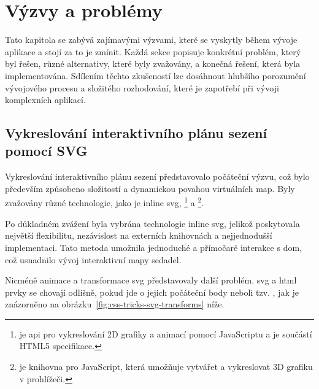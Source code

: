 \chapter{Výzvy a problémy}
\label{ch:vyzvy-a-problemy}
Tato kapitola se zabývá zajímavými výzvami, které se vyskytly během vývoje aplikace a stojí za to je zmínit.
Každá sekce popisuje konkrétní problém, který byl řešen, různé alternativy, které byly zvažovány, a konečná řešení, která byla implementována.
Sdílením těchto zkušeností lze dosáhnout hlubšího porozumění vývojového procesu a složitého rozhodování, které je zapotřebí při vývoji komplexních aplikací.



\section{Vykreslování interaktivního plánu sezení pomocí SVG}
\label{sec:vyzvy-a-problemy-rendering-sedadel}
Vykreslování interaktivního plánu sezení představovalo počáteční výzvu, což bylo především způsobeno složitostí a dynamickou povahou virtuálních map.
Byly zvažovány různé technologie, jako je inline \ac{svg}, \footnote{ je \ac{api} pro vykreslování 2D grafiky a animací pomocí JavaScriptu a je součástí HTML5 specifikace\cite{mdn_api_canvas_api}.} a \footnote{ je knihovna pro JavaScript, která umožňuje vytvářet a vykreslovat 3D grafiku v prohlížeči\cite{mdn_games_techniques_3d_on_the_web_building_up_a_basic_demo_with_three_js}.}.

Po důkladném zvážení byla vybrána technologie inline \ac{svg}, jelikož poskytovala největší flexibilitu, nezávislost na externích knihovnách a nejjednodušší implementaci\cite{s_blog_seating_plan_rendering}.
Tato metoda umožnila jednoduché a přímočaré interakce s \ac{dom}, což usnadnilo vývoj interaktivní mapy sedadel.

Nicméně animace a transformace \ac{svg} představovaly další problém.
\ac{svg} a \ac{html} prvky se chovají odlišně, pokud jde o jejich počáteční body neboli tzv. , jak je znázorněno na obrázku~\ref{fig:css-tricks-svg-transforms} níže.


